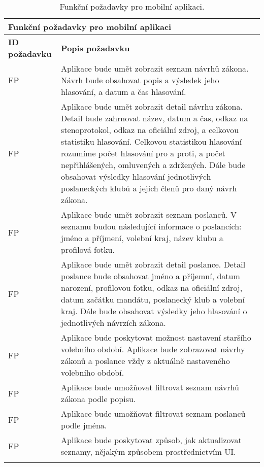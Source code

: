 \def\arraystretch{1.5}
\begin{longtable}{|l|p{9cm}|} \hline
	\multicolumn{2}{|l|}{\textbf{Funkční požadavky pro mobilní aplikaci}} \\ \hline
	
	\textbf{ID požadavku} & \textbf{Popis požadavku} \\ \hline
	
	FP\textunderscore01	& Aplikace bude umět zobrazit seznam návrhů zákona. Návrh bude obsahovat popis a výsledek jeho hlasování, a datum \linebreak a čas hlasování. \\ \hline
	
	FP\textunderscore02	& Aplikace bude umět zobrazit detail návrhu zákona. Detail bude zahrnovat název, datum a čas, odkaz na stenoprotokol, odkaz na oficiální zdroj, a celkovou statistiku hlasování. Celkovou statistikou hlasování rozumíme počet hlasování pro a proti, a počet nepřihlášených, omluvených \linebreak a zdržených. Dále bude obsahovat výsledky hlasování jednotlivých poslaneckých klubů a jejich členů pro daný návrh zákona. \\ \hline
	
	FP\textunderscore03	& Aplikace bude umět zobrazit seznam poslanců. V seznamu budou následující informace o poslancích: jméno \linebreak a příjmení, volební kraj, název klubu a profilová fotku. \\ \hline
	
	FP\textunderscore04	& Aplikace bude umět zobrazit detail poslance. Detail poslance bude obsahovat jméno a příjemní, datum \linebreak narození, profilovou fotku, odkaz na oficiální zdroj, datum začátku mandátu, poslanecký klub a volební kraj. Dále bude obsahovat výsledky jeho hlasování o jednotlivých návrzích zákona. \\ \hline
	
	FP\textunderscore05	& Aplikace bude poskytovat možnost nastavení staršího volebního období. Aplikace bude zobrazovat návrhy zákonů \linebreak a poslance vždy z aktuálně nastaveného volebního období. \\ \hline
	
	FP\textunderscore06	& Aplikace bude umožňovat filtrovat seznam návrhů zákona podle popisu.\\ \hline
	
	FP\textunderscore07	& Aplikace bude umožňovat filtrovat seznam poslanců podle jména.\\ \hline
	
	FP\textunderscore08	& Aplikace bude poskytovat způsob, jak aktualizovat seznamy, nějakým způsobem prostřednictvím UI.\\ \hline
	
	\caption{Funkční požadavky pro mobilní aplikaci.}
	\label{table:func_req_app}
\end{longtable}

